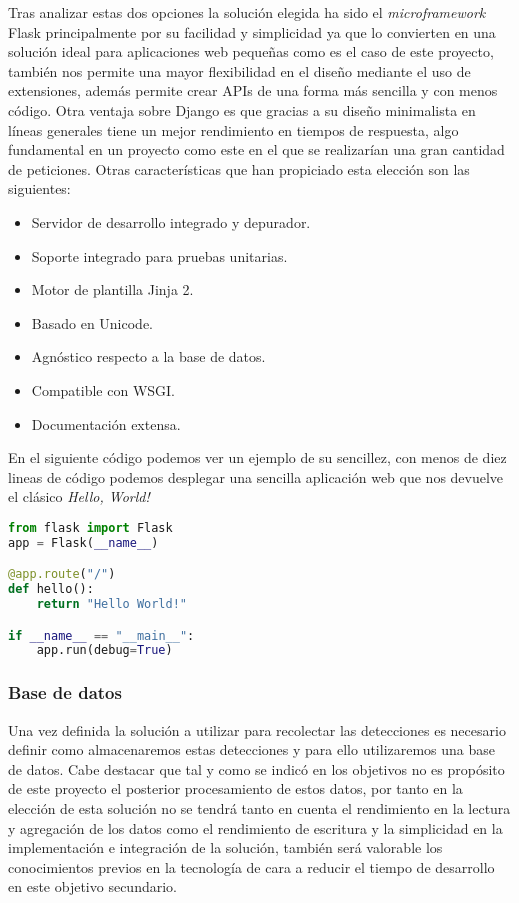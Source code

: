 \documentclass[../proyecto.tex]{subfiles}
\begin{document}
Tras analizar estas dos opciones la solución elegida ha sido el \textit{microframework} Flask principalmente por su facilidad y simplicidad ya que lo convierten en una solución ideal para aplicaciones web pequeñas como es el caso de este proyecto, también nos permite una mayor flexibilidad en el diseño mediante el uso de extensiones, además permite crear APIs de una forma más sencilla y con menos código. Otra ventaja sobre Django es que gracias a su diseño minimalista en líneas generales tiene un mejor rendimiento en tiempos de respuesta, algo fundamental en un proyecto como este en el que se realizarían una gran cantidad de peticiones. Otras características que han propiciado esta elección son las siguientes:

\begin{itemize}
  \item Servidor de desarrollo integrado y depurador.
  \item Soporte integrado para pruebas unitarias.
  \item Motor de plantilla Jinja 2.
  \item Basado en Unicode.
  \item Agnóstico respecto a la base de datos.
  \item Compatible con WSGI.
  \item Documentación extensa.
\end{itemize}

En el siguiente código podemos ver un ejemplo de su sencillez, con menos de diez lineas de código podemos desplegar una sencilla aplicación web que nos devuelve el clásico \textit{Hello, World!}\\

\begin{minipage}{\linewidth}
\begin{lstlisting}[language=Python, caption=Ejemplo de aplicación web básica con Flask, captionpos=b, frame=single]
from flask import Flask
app = Flask(__name__)

@app.route("/")
def hello():
    return "Hello World!"

if __name__ == "__main__":
    app.run(debug=True)
\end{lstlisting}
\end{minipage}

\subsubsection{Base de datos}

 Una vez definida la solución a utilizar para recolectar las detecciones es necesario definir como almacenaremos estas detecciones y para ello utilizaremos una base de datos. Cabe destacar que tal y como se indicó en los objetivos no es propósito de este proyecto el posterior procesamiento de estos datos, por tanto en la elección de esta solución no se tendrá tanto en cuenta el rendimiento en la lectura y agregación de los datos como el rendimiento de escritura y la simplicidad en la implementación e integración de la solución, también será valorable los conocimientos previos en la tecnología de cara a reducir el tiempo de desarrollo en este objetivo secundario.\\
\end{document}
